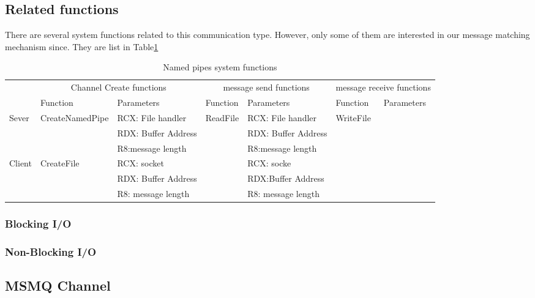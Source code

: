 \documentclass[paper=a4, fontsize=11pt]{scrartcl}
\numberwithin{equation}{section}		%
\numberwithin{figure}{section}			%
\numberwithin{table}{section}				%
\begin{document}
\subsection{Related functions}
There are several system functions related to this communication type. However, only some of them are interested in our message matching mechanism since. They are list in Table\ref{namedpipefunctions}
\begin{table}
        \centering
        \caption{Named pipes system functions}
        \label{namedpipefunctions}
        \begin{tabular}{|l|l|l|l|l|l|l|}
            \hline
             \multirow{2}{*}{} &
               \multicolumn{2}{c|}{Channel Create functions} &
               \multicolumn{2}{c|}{message send functions} &
               \multicolumn{2}{c|}{message receive functions} \\
             \cline{2-7}
              & Function& Parameters & Function & Parameters  & Function & Parameters\\
             \hline
             Sever& CreateNamedPipe&  RCX: File handler & ReadFile &  RCX: File handler &WriteFile&\\
             \cline{3-3} \cline{5-5} \cline{7-7}
             &&RDX: Buffer Address&& RDX: Buffer Address &&\\
              \cline{3-3} \cline{5-5} \cline{7-7}
               &&R8:message length&&R8:message length &&\\
                \cline{1-3} \cline{5-5} \cline{7-7}
             Client & CreateFile & RCX: socket & & RCX: socke  &&\\
              \cline{3-3} \cline{5-5} \cline{7-7}
             &&RDX: Buffer Address&&RDX:Buffer Address&&\\
              \cline{3-3} \cline{5-5} \cline{7-7}
               &&R8: message length&&R8: message length&&\\
            \hline
        \end{tabular}
    \end{table}
\subsubsection{Blocking I/O}
\subsubsection{Non-Blocking I/O}
\subsection{MSMQ Channel}
\end{document}
